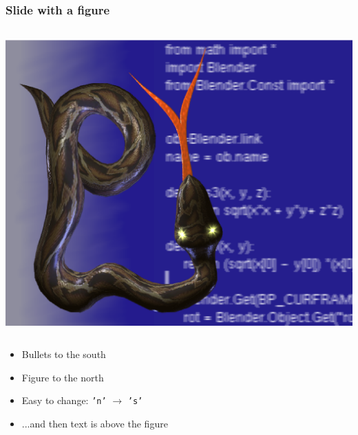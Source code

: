 \documentclass{beamer}
\begin{document}
\begin{frame}
\frametitle{Slide with a figure}


\begin{columns}

\centerline{\includegraphics[width=0.500000\linewidth,keepaspectratio]{python1.ps}}

\end{columns}
\begin{block}

\begin{itemize}
\item Bullets to the south
\item Figure to the north
\item Easy to change: \texttt{'n'} $\rightarrow$ \texttt{'s'}
\item ...and then text is above the figure
\end{itemize}

\end{block}

\end{frame}
\end{document}
